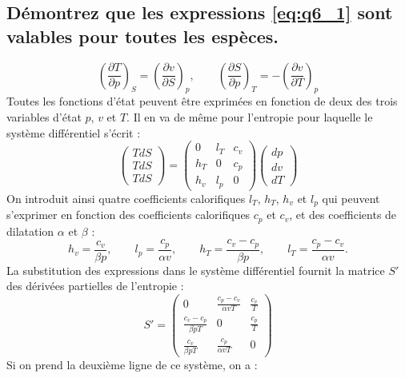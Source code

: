 \subsection{Démontrez que les expressions \ref{eq:q6_1} sont valables pour toutes les espèces.}
\begin{equation} \left(\frac{\partial T}{\partial p}\right)_S = \left(\frac{\partial v}{\partial S}\right)_p, \qquad \left(\frac{\partial S}{\partial p}\right)_T = - \left(\frac{\partial v}{\partial T}\right)_p \label{eq:q6_1}\end{equation}
Toutes les fonctions d'état peuvent être exprimées en fonction de deux des trois variables d'état $p$, $v$ et $T$. Il en va de même pour l'entropie pour laquelle le système différentiel s'écrit :
\begin{equation}\begin{pmatrix}TdS\\TdS\\TdS\end{pmatrix} = \begin{pmatrix}0 & l_T & c_v \\ h_T & 0 & c_p \\ h_v & l_p & 0\end{pmatrix}\begin{pmatrix}dp\\dv\\dT\end{pmatrix} \end{equation}
On introduit ainsi quatre coefficients calorifiques $l_T$, $h_T$, $h_v$ et $l_p$ qui peuvent s'exprimer en fonction des coefficients calorifiques $c_p$ et $c_v$, et des coefficients de dilatation $\alpha$ et $\beta$ :
\begin{equation} h_v = \frac{c_v}{\beta p}, \qquad l_p = \frac{c_p}{\alpha v}, \qquad h_T = \frac{c_v-c_p}{\beta p}, \qquad l_T = \frac{c_p-c_v}{\alpha v}.\end{equation}
La substitution des expressions dans le système différentiel fournit la matrice $S'$ des dérivées partielles de l'entropie :
\begin{equation} S' = \begin{pmatrix} 0 & \frac{c_p-c_v}{\alpha vT} & \frac{c_v}{T} \\ \frac{c_v-c_p}{\beta pT} & 0 & \frac{c_p}{T} \\ \frac{c_v}{\beta pT} & \frac{c_p}{\alpha vT} & 0 \end{pmatrix} \end{equation}
Si on prend la deuxième ligne de ce système, on a :
